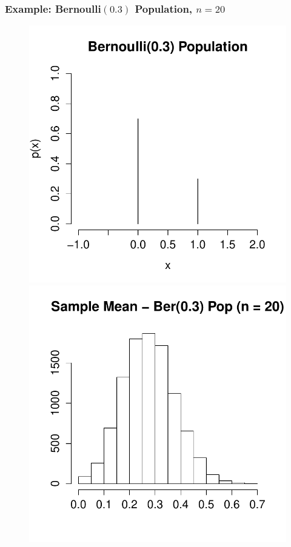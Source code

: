 \begin{frame}
\frametitle{Example: Bernoulli$(0.3)$ Population, $n =20$}
\begin{figure}
\centering
\includegraphics[scale = 0.4]{./images/bernoulli}
\includegraphics[scale = 0.4]{./images/xbar_bernoulli}
\end{figure}
\end{frame}

